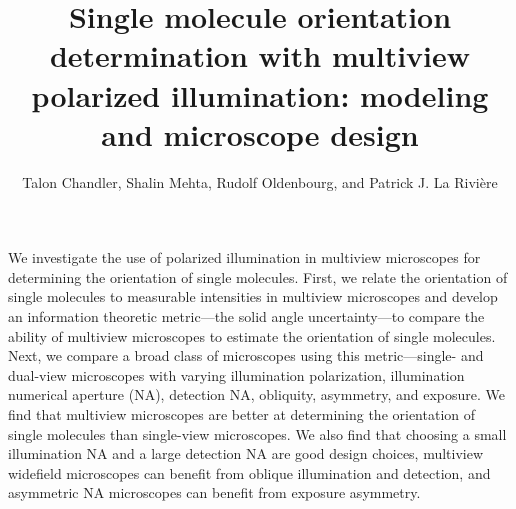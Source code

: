 \documentclass[10pt]{article}
\begin{document}
\title{Single molecule orientation determination with multiview polarized
  illumination: modeling and microscope design}

\author{Talon Chandler, Shalin Mehta, Rudolf
  Oldenbourg, and Patrick J. La Rivi\`ere}

\address{University of Chicago, Department of Radiology, Chicago, IL, USA.\\
  Marine Biological Laboratory, Bell Center for Regenerative Medicine, Woods Hole, MA, USA.\\
  Brown University, Department of Physics, Providence, RI, USA.}

\begin{abstract*}
  We investigate the use of polarized illumination in multiview microscopes for
  determining the orientation of single molecules. First, we relate the
  orientation of single molecules to measurable intensities in multiview
  microscopes and develop an information theoretic metric---the solid angle
  uncertainty---to compare the ability of multiview microscopes to estimate the
  orientation of single molecules. Next, we compare a broad class of microscopes
  using this metric---single- and dual-view microscopes with varying
  illumination polarization, illumination numerical aperture (NA), detection NA,
  obliquity, asymmetry, and exposure. We find that multiview microscopes are
  better at determining the orientation of single molecules than single-view
  microscopes. We also find that choosing a small illumination NA and a large
  detection NA are good design choices, multiview widefield microscopes can
  benefit from oblique illumination and detection, and asymmetric NA microscopes
  can benefit from exposure asymmetry.
\end{abstract*}





\end{document}
